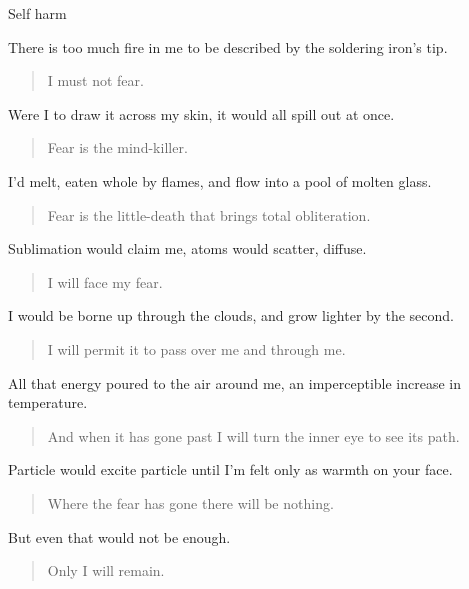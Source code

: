 Self harm

There is too much fire in me to be described by the soldering iron's tip.

\begin{quote}
I must not fear.
\end{quote}

Were I to draw it across my skin, it would all spill out at once.

\begin{quote}
Fear is the mind-killer.
\end{quote}

I'd melt, eaten whole by flames, and flow into a pool of molten glass.

\begin{quote}
Fear is the little-death that brings total obliteration.
\end{quote}

Sublimation would claim me, atoms would scatter, diffuse.

\begin{quote}
I will face my fear.
\end{quote}

I would be borne up through the clouds, and grow lighter by the second.

\begin{quote}
I will permit it to pass over me and through me.
\end{quote}

All that energy poured to the air around me, an imperceptible increase in temperature.

\begin{quote}
And when it has gone past I will turn the inner eye to see its path.
\end{quote}

Particle would excite particle until I'm felt only as warmth on your face.

\begin{quote}
Where the fear has gone there will be nothing.
\end{quote}

But even that would not be enough.

\begin{quote}
Only I will remain.
\end{quote}
